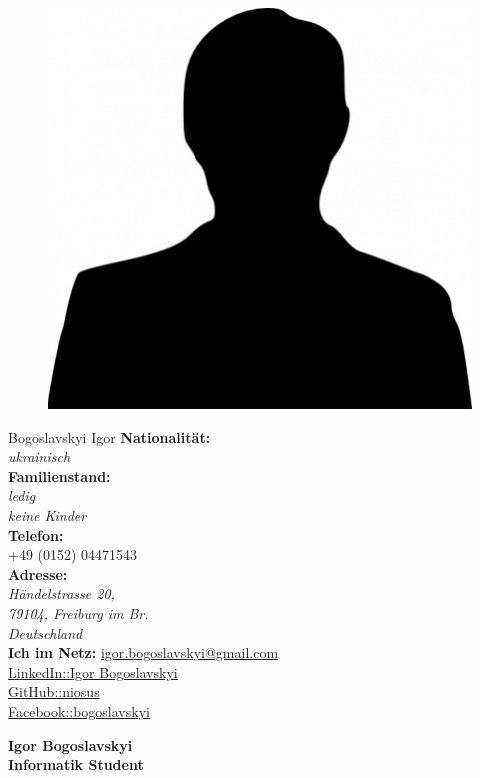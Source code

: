\documentclass[a4paper,12pt,final]{memoir}
\newcommand{\SmallSep}{\vspace{0.5em}}
\begin{document}
\begin{figure}
	\hfill
	\includegraphics[width=0.6\columnwidth]{photo.jpg}
	\vspace{-6cm}
\end{figure}
\begin{flushright}\small
	Bogoslavskyi Igor
	\textbf{Nationalit\"{a}t:} \emph{\\ukrainisch\\}
	\textbf{Familienstand:} \emph{\\ledig \\keine Kinder\\}
	\SmallSep
	\textbf{Telefon:}\\
	+49 (0152) 04471543\\
	\textbf{Adresse:}\\ \emph{H\"{a}ndelstrasse 20, \\79104, Freiburg im Br. \\Deutschland}\\
	\SmallSep
	\textbf{Ich im Netz:}
	\href{mailto:igor.bogoslavskyi@gmail.com}{igor.bogoslavskyi@gmail.com}\\ 
	\SmallSep
	\href{http://www.linkedin.com/pub/igor-bogoslavskyi/43/50b/726}{LinkedIn::Igor Bogoslavskyi}\\ 
	\SmallSep
	\href{https://github.com/niosus}{GitHub::niosus}\\
	\SmallSep
	\href{https://www.facebook.com/bogoslavskyi}{Facebook::bogoslavskyi}\\ 
	\SmallSep
\end{flushright}\normalsize
\framebreak


\Huge\bfseries {\color{MidnightBlue} Igor Bogoslavskyi} \\
\Large\bfseries  Informatik Student \\
\end{document}
